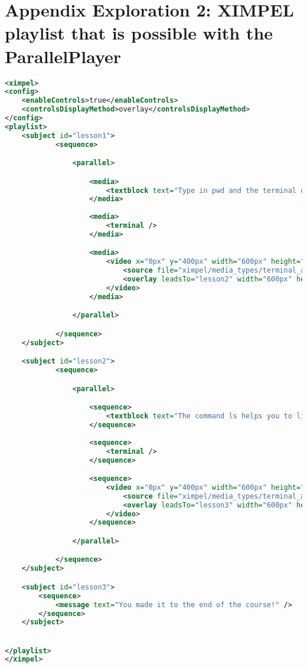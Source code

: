 \chapter{Appendix Exploration 2: XIMPEL playlist that is possible with the ParallelPlayer}
\label{chap:exploration2_appendix}
\begin{lstlisting}[language=XML, caption=this playlist can now be played thanks to the ParallelPlayer., label=playlist:example_playlist]
<ximpel>
<config>
    <enableControls>true</enableControls>
    <controlsDisplayMethod>overlay</controlsDisplayMethod>
</config>
<playlist>
    <subject id="lesson1">
            <sequence>

                <parallel>

                    <media>
                        <textblock text="Type in pwd and the terminal displays which directory you are working in." width="600px" height="800px" x="0px" y="0px" color="#0f0" fontsize='50px' fontcolor="#fff"/>
                    </media>
                    
                    <media>
                        <terminal />    
                    </media>

                    <media>
                        <video x="0px" y="400px" width="600px" height="900px">
                            <source file="ximpel/media_types/terminal_assets/pwd" extensions="mp4" types="video/mp4" />
                            <overlay leadsTo="lesson2" width="600px" height="75px" x="0px" y="500px" text="next lesson"/>
                        </video> 
                    </media>

                </parallel>

            </sequence>
    </subject>

    <subject id="lesson2">
            <sequence>

                <parallel>

                    <sequence>
                        <textblock text="The command ls helps you to list the files that are in the current directory you are working in." width="600px" height="800px" x="0px" y="0px" color="#0f0" fontsize='50px' />
                    </sequence>
                    
                    <sequence>
                        <terminal />    
                    </sequence>

                    <sequence>
                        <video x="0px" y="400px" width="600px" height="900px">
                            <source file="ximpel/media_types/terminal_assets/ls" extensions="mp4" types="video/mp4" />
                            <overlay leadsTo="lesson3" width="600px" height="75px" x="0px" y="500px" text="next lesson"/>
                        </video> 
                    </sequence>

                </parallel>

            </sequence>
    </subject>

    <subject id="lesson3">
        <sequence>
            <message text="You made it to the end of the course!" />
        </sequence>
    </subject>


</playlist>
</ximpel>
\end{lstlisting}